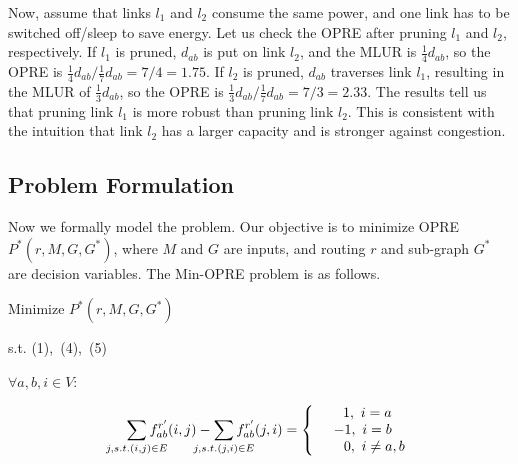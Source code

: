 \documentclass[conference]{IEEEtran}
\begin{document}
Now, assume that links $l_1$ and $l_2$ consume the same power, and one link has to be switched off/sleep to save energy. Let us check the OPRE after pruning $l_1$ and $l_2$, respectively. If $l_1$ is pruned, $d_{ab}$ is put on link $l_2$, and the MLUR is $\frac{1}{4}d_{ab}$, so the OPRE is $\frac{1}{4}d_{ab}/\frac{1}{7}d_{ab} = 7/4 = 1.75$. If $l_2$ is pruned, $d_{ab}$ traverses link $l_1$, resulting in the MLUR of $\frac{1}{3}d_{ab}$, so the OPRE is $\frac{1}{3}d_{ab}/\frac{1}{7}d_{ab} = 7/3 = 2.33$. The results tell us that pruning link $l_1$ is more robust than pruning link $l_2$. This is consistent with the intuition that link $l_2$ has a larger capacity and is stronger against congestion.

\subsection{Problem Formulation}

Now we formally model the problem. Our objective is to minimize OPRE $P^*(r, M, G, G^*)$, where $M$ and $G$ are inputs, and routing $r$ and sub-graph $G^*$ are decision variables. The Min-OPRE problem is as follows.

\begin{center}
Minimize \quad $P^*(r, M, G, G^*)$
\end{center}

\begin{center}
s.t. (1),\ (4),\ (5)
\end{center}

\begin{center}
    $\forall a,b,i \in V$: \quad \quad \quad \quad \quad \quad \quad \quad \quad \quad \quad \quad \quad \quad \quad
    \vspace{-0.3in}
\end{center}

\begin{equation}
\label{equation_flow_for_routing_second}
    \begin{split}
    \sum_{j, s.t.(i,j) \in E}\hspace{-0.2in}f^{r'}_{ab}(i,j) - \hspace{-0.2in}\sum_{j, s.t.(j,i) \in E}\hspace{-0.2in}f^{r'}_{ab}(j,i) =
    \left\{
        \begin{array}{c}
        \ \ 1, \ i = a \\
        -1, \ i = b \\
        \ \ \ \ \ 0, \ i \neq a,b \\
        \end{array}
    \right.
    \end{split}
\end{equation}
\end{document}
